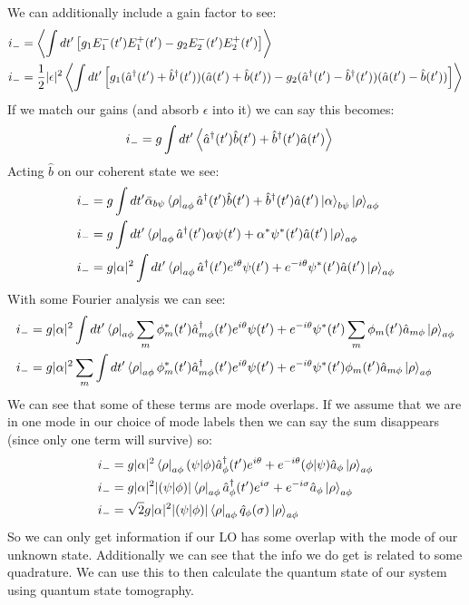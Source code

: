 We can additionally include a gain factor to see:
\begin{align*}
	i_- &= \expval{\int dt' \left[g_1 E_1^-(t')E_1^+(t') - g_2 E_2^-(t')E_2^+(t')\right]} \\
	i_- &= \frac{1}{2} |\epsilon|^2\expval{\int dt' \left[g_1 (\hat{a}^\dagger(t') + \hat{b}^\dagger(t'))(\hat{a}(t') + \hat{b}(t')) - g_2 (\hat{a}^\dagger(t') - \hat{b}^\dagger(t'))(\hat{a}(t') - \hat{b}(t'))\right]}
\end{align*}
If we match our gains (and absorb $\epsilon$ into it) we can say this becomes:
\begin{align*}
	i_- &= g\int dt' \expval{\hat{a}^\dagger(t')\hat{b}(t') + \hat{b}^\dagger(t')\hat{a}(t')}
\end{align*}
Acting $\hat{b}$ on our coherent state we see:
\begin{align*}
	i_- &= g\int dt' \bar{\alpha}_{b\psi}\bra{\rho}_{a\phi}\hat{a}^\dagger(t')\hat{b}(t') + \hat{b}^\dagger(t')\hat{a}(t')\ket{\alpha}_{b\psi}\ket{\rho}_{a\phi} \\
	i_- &= g\int dt' \bra{\rho}_{a\phi}\hat{a}^\dagger(t')\alpha\psi(t') + \alpha^*\psi^*(t')\hat{a}(t')\ket{\rho}_{a\phi} \\
	i_- &= g|\alpha|^2\int dt' \bra{\rho}_{a\phi}\hat{a}^\dagger(t')e^{i\theta}\psi(t') + e^{-i\theta}\psi^*(t')\hat{a}(t')\ket{\rho}_{a\phi}
\end{align*}
With some Fourier analysis we can see:
\begin{align*}
	i_- &= g|\alpha|^2\int dt' \bra{\rho}_{a\phi}\sum_m\phi_m^*(t')\hat{a}_{m\phi}^\dagger(t')e^{i\theta}\psi(t') + e^{-i\theta}\psi^*(t')\sum_m \phi_m(t')\hat{a}_{m\phi}\ket{\rho}_{a\phi} \\
	i_- &= g|\alpha|^2\sum_m\int dt' \bra{\rho}_{a\phi}\phi_m^*(t')\hat{a}_{m\phi}^\dagger(t')e^{i\theta}\psi(t') + e^{-i\theta}\psi^*(t') \phi_m(t')\hat{a}_{m\phi}\ket{\rho}_{a\phi}
\end{align*}
We can see that some of these terms are mode overlaps. If we assume that we are in one mode in our choice of mode labels then we can say the sum disappears (since only one term will survive) so:
\begin{align*}
	i_- &= g|\alpha|^2\bra{\rho}_{a\phi}(\psi|\phi)\hat{a}_{\phi}^\dagger(t')e^{i\theta} + e^{-i\theta}(\phi|\psi) \hat{a}_{\phi}\ket{\rho}_{a\phi} \\
	i_- &= g|\alpha|^2|(\psi|\phi)|\bra{\rho}_{a\phi}\hat{a}_{\phi}^\dagger(t')e^{i\sigma} + e^{-i\sigma}\hat{a}_{\phi}\ket{\rho}_{a\phi} \\
	i_- &= \sqrt{2}g|\alpha|^2|(\psi|\phi)|\bra{\rho}_{a\phi}\hat{q}_{\phi}(\sigma)\ket{\rho}_{a\phi}
\end{align*}
So we can only get information if our LO has some overlap with the mode of our unknown state. Additionally we can see that the info we do get is related to some quadrature.
We can use this to then calculate the quantum state of our system using quantum state tomography.

